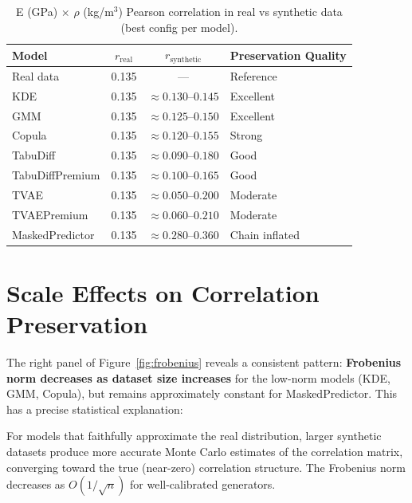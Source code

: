 \documentclass[11pt, a4paper]{report}
\begin{document}
\begin{table}[H]
\centering
\caption{E (GPa) $\times$ $\rho$ (kg/m$^3$) Pearson correlation in real vs synthetic data (best config per model).}
\label{tab:pair_corr}
\begin{tabular}{lccl}
\toprule
\textbf{Model} & \textbf{$r_{\text{real}}$} & \textbf{$r_{\text{synthetic}}$} & \textbf{Preservation Quality} \\
\midrule
Real data        & 0.135 & --- & Reference \\
KDE              & 0.135 & $\approx 0.130$--$0.145$ & Excellent \\
GMM              & 0.135 & $\approx 0.125$--$0.150$ & Excellent \\
Copula           & 0.135 & $\approx 0.120$--$0.155$ & Strong \\
TabuDiff         & 0.135 & $\approx 0.090$--$0.180$ & Good \\
TabuDiffPremium  & 0.135 & $\approx 0.100$--$0.165$ & Good \\
TVAE             & 0.135 & $\approx 0.050$--$0.200$ & Moderate \\
TVAEPremium      & 0.135 & $\approx 0.060$--$0.210$ & Moderate \\
MaskedPredictor  & 0.135 & $\approx 0.280$--$0.360$ & Chain inflated \\
\bottomrule
\end{tabular}
\end{table}


\chapter{Scale Effects on Correlation Preservation}

The right panel of Figure~\ref{fig:frobenius} reveals a consistent pattern: \textbf{Frobenius norm decreases as dataset size increases} for the low-norm models (KDE, GMM, Copula), but remains approximately constant for MaskedPredictor. This has a precise statistical explanation:

For models that faithfully approximate the real distribution, larger synthetic datasets produce more accurate Monte Carlo estimates of the correlation matrix, converging toward the true (near-zero) correlation structure. The Frobenius norm decreases as $O(1/\sqrt{n})$ for well-calibrated generators.
\end{document}
